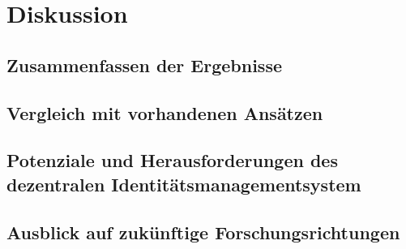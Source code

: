 \chapter{Diskussion}
\label{cha:diskussion}

\section{Zusammenfassen der Ergebnisse}
\blindtext

\section{Vergleich mit vorhandenen Ansätzen}
\blindtext

\section{Potenziale und Herausforderungen des dezentralen Identitätsmanagementsystem}
\blindtext

\section{Ausblick auf zukünftige Forschungsrichtungen}
\blindtext
